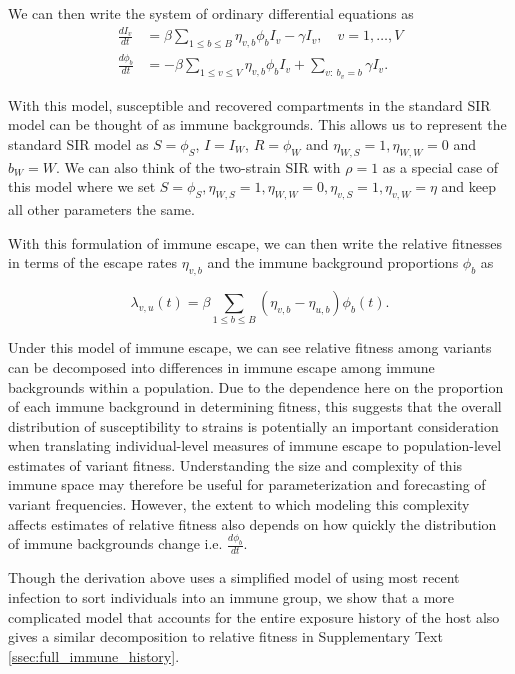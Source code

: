 \documentclass[11pt,oneside,letterpaper]{article}
\newcommand{\wt}{W}
\newcommand{\varEscape}{\eta}
\newcommand{\varTransmission}{\rho}
\begin{document}
We can then write the system of ordinary differential equations as
\begin{align}
    \frac{d I_{v}}{dt} &= \beta \sum_{1\leq b \leq B} \varEscape_{v, b} \phi_{b} I_{v} - \gamma I_{v}, \quad v = 1, \ldots, V\\
    \frac{d \phi_{b}}{dt} &= - \beta \sum_{1\leq v \leq V} \varEscape_{v,b}\phi_{b} I_{v} +  \sum_{v:\ b_{v} = b} \gamma I_{v}.
\end{align}

With this model, susceptible and recovered compartments in the standard SIR model can be thought of as immune backgrounds.
This allows us to represent the standard SIR model as $S = \phi_{S}$, $I = I_{\wt}$, $R = \phi_{\wt}$ and $\varEscape_{\wt, S} = 1, \varEscape_{\wt, \wt} = 0$ and $b_{\wt} = \wt$.
We can also think of the two-strain SIR with $\varTransmission = 1$ as a special case of this model where we set $S = \phi_{S}, \varEscape_{\wt, S} = 1, \varEscape_{\wt, \wt} = 0, \varEscape_{v, S} = 1, \varEscape_{v, \wt} = \varEscape$ and keep all other parameters the same.

With this formulation of immune escape, we can then write the relative fitnesses in terms of the escape rates $\varEscape_{v,b}$ and the immune background proportions $\phi_{b}$ as

\begin{equation} \label{eq:escape_relative_fitness}
    \lambda_{v, u}(t) = \beta \sum_{1\leq b \leq B}(\varEscape_{v,b} - \varEscape_{u,b}) \phi_{b}(t).
\end{equation}

Under this model of immune escape, we can see relative fitness among variants can be decomposed into differences in immune escape among immune backgrounds within a population.
Due to the dependence here on the proportion of each immune background in determining fitness, this suggests that the overall distribution of susceptibility to strains is potentially an important consideration when translating individual-level measures of immune escape to population-level estimates of variant fitness.
Understanding the size and complexity of this immune space may therefore be useful for parameterization and forecasting of variant frequencies.
However, the extent to which modeling this complexity affects estimates of relative fitness also depends on how quickly the distribution of immune backgrounds change i.e. $\frac{d\phi_{b}}{dt}$.

Though the derivation above uses a simplified model of using most recent infection to sort individuals into an immune group, we show that a more complicated model that accounts for the entire exposure history of the host also gives a similar decomposition to relative fitness in Supplementary Text \ref{ssec:full_immune_history}.
\end{document}

